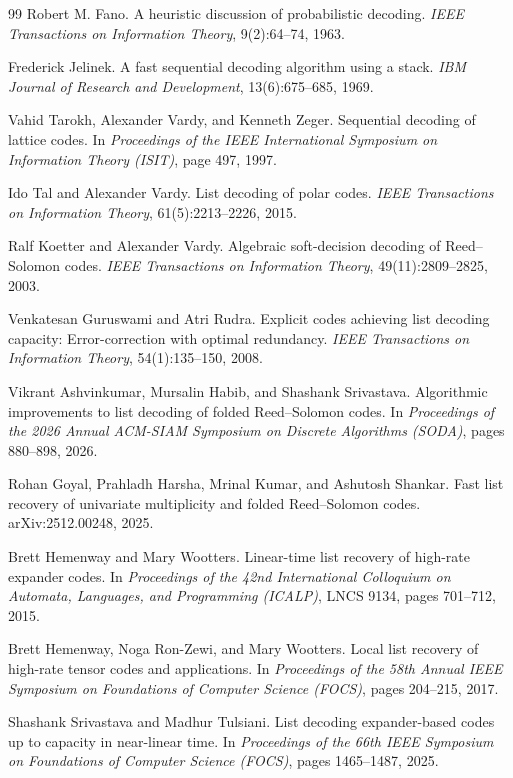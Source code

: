 \documentclass[10pt]{article}
\theoremstyle{definition}
\begin{document}
\begin{thebibliography}{99}
   Robert M. Fano.
   \newblock A heuristic discussion of probabilistic decoding.
   \newblock \emph{IEEE Transactions on Information Theory}, 9(2):64--74, 1963.

   Frederick Jelinek.
   \newblock A fast sequential decoding algorithm using a stack.
   \newblock \emph{IBM Journal of Research and Development}, 13(6):675--685, 1969.

   Vahid Tarokh, Alexander Vardy, and Kenneth Zeger.
   \newblock Sequential decoding of lattice codes.
   \newblock In \emph{Proceedings of the IEEE International Symposium on
   Information Theory (ISIT)}, page 497, 1997.

   Ido Tal and Alexander Vardy.
   \newblock List decoding of polar codes.
   \newblock \emph{IEEE Transactions on Information Theory}, 61(5):2213--2226, 2015.

   Ralf Koetter and Alexander Vardy.
   \newblock Algebraic soft-decision decoding of Reed--Solomon codes.
   \newblock \emph{IEEE Transactions on Information Theory}, 49(11):2809--2825, 2003.

   Venkatesan Guruswami and Atri Rudra.
   \newblock Explicit codes achieving list decoding capacity: Error-correction
   with optimal redundancy.
   \newblock \emph{IEEE Transactions on Information Theory}, 54(1):135--150,
   2008.

   Vikrant Ashvinkumar, Mursalin Habib, and Shashank Srivastava.
   \newblock Algorithmic improvements to list decoding of folded
   Reed--Solomon codes.
   \newblock In \emph{Proceedings of the 2026 Annual ACM-SIAM Symposium on
   Discrete Algorithms (SODA)}, pages 880--898, 2026.

   Rohan Goyal, Prahladh Harsha, Mrinal Kumar, and Ashutosh Shankar.
   \newblock Fast list recovery of univariate multiplicity and folded
   Reed--Solomon codes.
   \newblock arXiv:2512.00248, 2025.

   Brett Hemenway and Mary Wootters.
   \newblock Linear-time list recovery of high-rate expander codes.
   \newblock In \emph{Proceedings of the 42nd International Colloquium on
   Automata, Languages, and Programming (ICALP)}, LNCS 9134, pages 701--712,
   2015.

   Brett Hemenway, Noga Ron-Zewi, and Mary Wootters.
   \newblock Local list recovery of high-rate tensor codes and applications.
   \newblock In \emph{Proceedings of the 58th Annual IEEE Symposium on
   Foundations of Computer Science (FOCS)}, pages 204--215, 2017.

   Shashank Srivastava and Madhur Tulsiani.
   \newblock List decoding expander-based codes up to capacity in near-linear time.
   \newblock In \emph{Proceedings of the 66th IEEE Symposium on Foundations
   of Computer Science (FOCS)}, pages 1465--1487, 2025.

\end{thebibliography}
\end{document}
